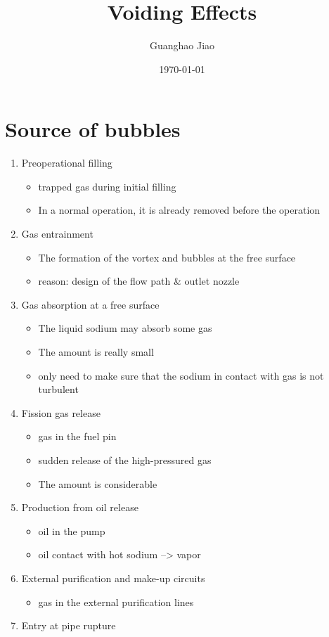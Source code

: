 \documentclass[11pt]{article}
\author{Guanghao Jiao}
\date{\today}
\title{Voiding Effects}
\begin{document}
\maketitle
\tableofcontents

\section{Source of bubbles}
\label{sec:org9ad3335}
\begin{enumerate}
\item Preoperational filling
\begin{itemize}
\item trapped gas during initial filling
\item In a normal operation, it is already removed before the operation
\end{itemize}
\item Gas entrainment
\begin{itemize}
\item The formation of the vortex and bubbles at the free surface
\item reason: design of the flow path \& outlet nozzle
\end{itemize}
\item Gas absorption at a free surface
\begin{itemize}
\item The liquid sodium may absorb some gas
\item The amount is really small
\item only need to make sure that the sodium in contact with gas is not turbulent
\end{itemize}
\item Fission gas release
\begin{itemize}
\item gas in the fuel pin
\item sudden release of the high-pressured gas
\item The amount is considerable
\end{itemize}
\item Production from oil release
\begin{itemize}
\item oil in the pump
\item oil contact with hot sodium --> vapor
\end{itemize}
\item External purification and make-up circuits
\begin{itemize}
\item gas in the external purification lines
\end{itemize}
\item Entry at pipe rupture
\end{enumerate}
\end{document}

